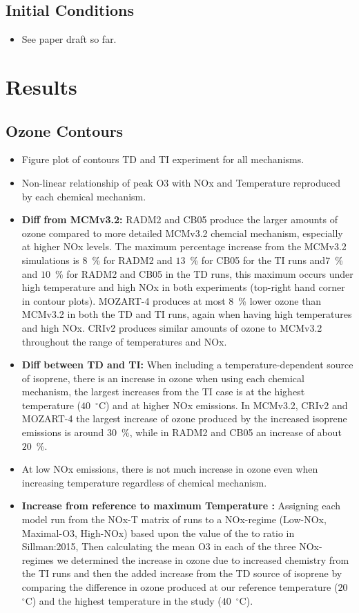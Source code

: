\documentclass[11pt,a4paper]{article}
\begin{document}
\subsection{Initial Conditions}
\begin{itemize}
    \item See paper draft so far.
\end{itemize}

\section{Results} \label{s:results}
\subsection{Ozone Contours}
\begin{itemize}
    \item Figure plot of contours TD and TI experiment for all mechanisms.
    \item Non-linear relationship of peak O3 with NOx and Temperature reproduced by each chemical mechanism.
    \item \textbf{Diff from MCMv3.2:} RADM2 and CB05 produce the larger amounts of ozone compared to more detailed MCMv3.2 chemcial mechanism, especially at higher NOx levels. The maximum percentage increase from the MCMv3.2 simulations is $8$~\% for RADM2 and $13$~\% for CB05 for the TI runs and$7$~\% and $10$~\% for RADM2 and CB05 in the TD runs, this maximum occurs under high temperature and high NOx in both experiments (top-right hand corner in contour plots). MOZART-4 produces at most $8$~\% lower ozone than MCMv3.2 in both the TD and TI runs, again when having high temperatures and high NOx.  CRIv2 produces similar amounts of ozone to MCMv3.2 throughout the range of temperatures and NOx.
    \item \textbf{Diff between TD and TI:} When including a temperature-dependent source of isoprene, there is an increase in ozone when using each chemical mechanism, the largest increases from the TI case is at the highest temperature ($40$~$^{\circ}$C) and at higher NOx emissions. In MCMv3.2, CRIv2 and MOZART-4 the largest increase of ozone produced by the increased isoprene emissions is around $30$~\%, while in RADM2 and CB05 an increase of about $20$~\%.
    \item At low NOx emissions, there is not much increase in ozone even when increasing temperature regardless of chemical mechanism.
    \item \textbf{Increase from reference to maximum Temperature :} Assigning each model run from the NOx-T matrix of runs to a NOx-regime (Low-NOx, Maximal-O3, High-NOx) based upon the value of the to  ratio in Sillman:2015, Then calculating the mean O3 in each of the three NOx-regimes we determined the increase in ozone due to increased chemistry from the TI runs and then the added increase from the TD source of isoprene by comparing the difference in ozone produced at our reference temperature ($20$~$^{\circ}$C) and the highest temperature in the study ($40$~$^{\circ}$C).

\end{itemize}
\end{document}
